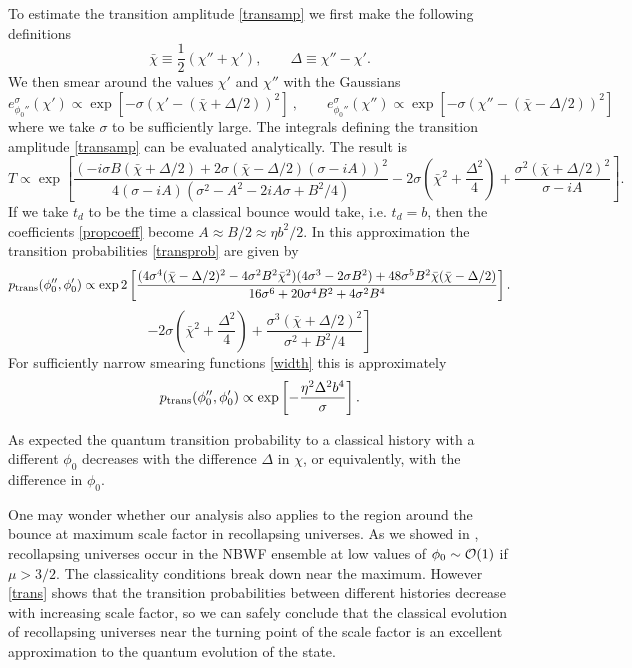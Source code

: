 \documentclass[prd,floats,superscriptaddress,eqsecnum,floatfix,nofootinbib,12pt]{revtex4}
\def\td{TD\ }
\def\p0{\phi_0}
\def\be{\begin{equation}}
\def\ee{\end{equation}}
\def\p0{\phi_0}
\def\td{t_d}
\begin{document}
{{{{To estimate the transition amplitude \eqref{transamp} we first make the following definitions
\be
\bar\chi\equiv \frac{1}{2}(\chi''+\chi'), \qquad \Delta \equiv \chi'' - \chi'.
\label{defs1}
\ee
We then smear around the values $\chi'$ and $\chi''$ with the Gaussians
\be
\label{width} 
e^{\sigma}_{\p0''}(\chi') \propto \exp \left[-\sigma(\chi' - (\bar \chi +\Delta/2))^2\right]\ , \qquad 
e^{\sigma}_{\p0''}(\chi'') \propto  \exp \left[-\sigma(\chi'' - (\bar \chi -\Delta/2))^2\right]
\ee
where we take $\sigma$ to be sufficiently large. 
The integrals defining the transition amplitude \eqref{transamp} can be evaluated analytically. The result  is
\be
T\propto \exp\left[\frac{(-i\sigma B(\bar \chi+\Delta/2) +2\sigma (\bar \chi-\Delta/2) (\sigma -iA))^2}{4(\sigma -iA)(\sigma^2 -A^2 -2iA\sigma +B^2/4)}
-2\sigma \left(\bar \chi^2 +\frac{\Delta^2}{4}\right) +\frac{\sigma^2 (\bar \chi+\Delta/2)^2}{\sigma -iA}\right] .
\ee
If we take $\td$ to be the time a classical bounce would take, i.e. $\td=b$, then the coefficients \eqref{propcoeff} become $A \approx B/2 \approx \eta b^2/2$. In this approximation the transition probabilities \eqref{transprob} are given by
\be
p_{\rm trans}(\p0'',\p0') \propto  \exp 2\left[ \frac{(4\sigma^4 (\bar \chi-\Delta/2)^2 - 4\sigma^2 B^2\bar \chi^2)(4\sigma^3 - 2\sigma B^2) +48\sigma^5 B^2 \bar \chi (\bar \chi-\Delta/2)}{16\sigma^6 +20 \sigma^4 B^2 +4\sigma^2 B^4} \right]. \nonumber
\ee
\be
\label{transprob-ex}
\left.  -2\sigma \left(\bar \chi^2 +\frac{\Delta^2}{4}\right) +\frac{\sigma^3 (\bar \chi+\Delta/2)^2}{\sigma^2 +B^2/4}\right]
\ee
For sufficiently narrow smearing functions \eqref{width} this is approximately
\be \label{trans}
p_{\rm trans}(\p0'',\p0') \propto  \exp \left[ - \frac{ \eta^2 \Delta^2 b^4}{\sigma} \right].
\ee

As expected the quantum transition probability to a classical history with a different $\phi_0$ decreases with the difference $\Delta$ in $\chi$, or equivalently, with the difference in $\phi_0$. 

One may wonder whether our analysis also applies to the region around the bounce at maximum scale factor in recollapsing universes. As we showed in \cite{HHH08b}, recollapsing universes occur in the NBWF ensemble at low values of $\phi_0 \sim {\cal O}(1)$ if $\mu >3/2$. The classicality conditions break down near the maximum. However \eqref{trans} shows that the transition probabilities between different histories decrease 
with increasing scale factor, so we can safely conclude that the classical evolution of recollapsing universes near the turning point of the scale factor is an excellent approximation to the quantum evolution of the state.


}}}}
\end{document}
